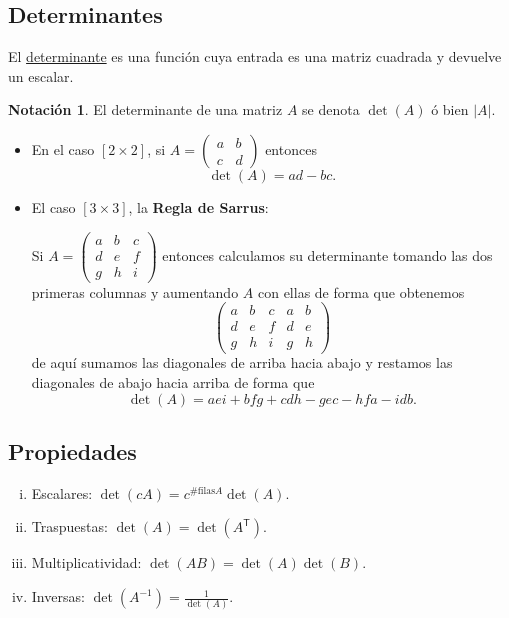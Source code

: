\documentclass[12pt]{article}
\theoremstyle{plain}
\theoremstyle{definition}
\newtheorem*{Not}{Notación}       %
\theoremstyle{remark}
\newcommand{\sT}{\mathsf{T}}        %
\newcommand{\x}{\times}             %
\renewcommand{\:}{\colon}           %
\newcommand{\un}[1]{\underline{#1}}
\renewcommand{\.}{\Cdot}                %
\begin{document}
\begin{multicols}{2}

\subsection*{Determinantes}

El \un{determinante} es una función cuya entrada es una matriz cuadrada y devuelve un escalar. 

\begin{Not}
El determinante de una matriz $A$ se denota $\det(A)$ ó bien $|A|$.
\end{Not}

\begin{itemize}
  \item En el caso $[2\x 2]$, si $A=\begin{pmatrix}
    a&b\\c&d
  \end{pmatrix}$ entonces
  $$\det(A)=ad-bc.$$
  
  \item El caso $[3\x 3]$, la \textbf{Regla de Sarrus}:\par 
  Si $A=\begin{pmatrix}
    a&b&c\\d&e&f\\g&h&i
  \end{pmatrix}$ entonces calculamos su determinante tomando las dos primeras columnas y aumentando $A$ con ellas de forma que obtenemos
  $$\left(\begin{array}{ccc|cc}
    a&b&c&a&b\\d&e&f&d&e\\g&h&i&g&h
  \end{array}\right)$$
  de aquí sumamos las diagonales de arriba hacia abajo y restamos las diagonales de abajo hacia arriba de forma que 
  $$\det(A)=aei+bfg+cdh-gec-hfa-idb.$$
\end{itemize}

\subsection*{Propiedades}

\begin{enumerate}[i)]
  \item Escalares: $\det(cA)=c^{\#\text{filas} A}\det(A)$.
  \item Traspuestas: $\det(A)=\det(A^\sT)$.
  \item Multiplicatividad: $\det(AB)=\det(A)\det(B)$.
  \item Inversas: $\det(A^{-1})=\frac{1}{\det(A)}$.
\end{enumerate}


\end{multicols}
\end{document}
